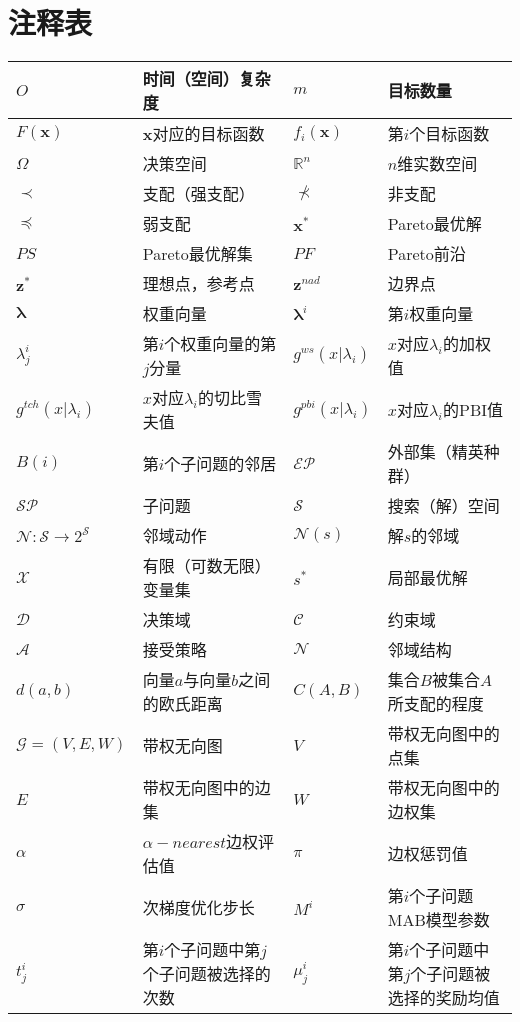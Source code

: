 
\chapter*{注释表}
\label{chap:注释表}

\noindent\begin{longtabu} to \hline
$O$ & 时间（空间）复杂度 & $m$ & 目标数量 \\ \hline
$F(\mathbf{x})$ & $\mathbf{x}$对应的目标函数 & $f_i(\mathbf{x})$ & 第$i$个目标函数 \\ \hline
$\Omega$ & 决策空间 & $\mathbb{R}^n$ & $n$维实数空间 \\ \hline
$\prec$ & 支配（强支配） & $\not \prec$ & 非支配 \\ \hline
$\preceq$ & 弱支配 & $\mathbf{x}^*$ & Pareto最优解  \\ \hline 
$PS$ & Pareto最优解集 & $PF$ & Pareto前沿\\ \hline 
$\mathbf{z}^*$ & 理想点，参考点 & $\mathbf{z}^{nad}$ & 边界点 \\ \hline
$\boldsymbol{\lambda}$ & 权重向量 & $\boldsymbol{\lambda}^i$ & 第$i$权重向量 \\ \hline
$\lambda^i_j$ & 第$i$个权重向量的第$j$分量 & $g^{ws}(x|\lambda_i)$ & $x$对应$\lambda_i$的加权值 \\ \hline
$g^{tch}(x|\lambda_i)$ & $x$对应$\lambda_i$的切比雪夫值 & $g^{pbi}(x|\lambda_i)$ & $x$对应$\lambda_i$的PBI值 \\ \hline
$B(i)$ & 第$i$个子问题的邻居 & $\mathcal{EP}$ & 外部集（精英种群） \\ \hline
$\mathcal{SP}$ & 子问题 & $\mathcal{S}$ & 搜索（解）空间 \\ \hline
$\mathcal{N}:\mathcal{S}\rightarrow 2^{\mathcal{S}}$ & 邻域动作 & $\mathcal{N}(s)$ & 解$s$的邻域 \\ \hline
$\mathcal{X}$ & 有限（可数无限）变量集 & $s^*$ & 局部最优解 \\ \hline
$\mathcal{D}$ & 决策域 & $\mathcal{C}$ & 约束域 \\ \hline
$\mathcal{A}$ & 接受策略 & $\mathcal{N}$ & 邻域结构 \\ \hline
$d(a,b)$ & 向量$a$与向量$b$之间的欧氏距离 & $C(A,B)$ & 集合$B$被集合$A$所支配的程度 \\ \hline
$\mathcal{G} = (V,E,W)$ & 带权无向图 & $V$ & 带权无向图中的点集 \\ \hline
$E$ & 带权无向图中的边集 & $W$ & 带权无向图中的边权集 \\ \hline
$\alpha$ & $\alpha-nearest$边权评估值 & $\pi$ & 边权惩罚值 \\ \hline
$\sigma$ & 次梯度优化步长 & $M^i$ & 第$i$个子问题MAB模型参数 \\ \hline
$t^i_j$ & 第$i$个子问题中第$j$个子问题被选择的次数 & $\mu^i_j$ & 第$i$个子问题中第$j$个子问题被选择的奖励均值 \\ \hline

\end{longtabu}

